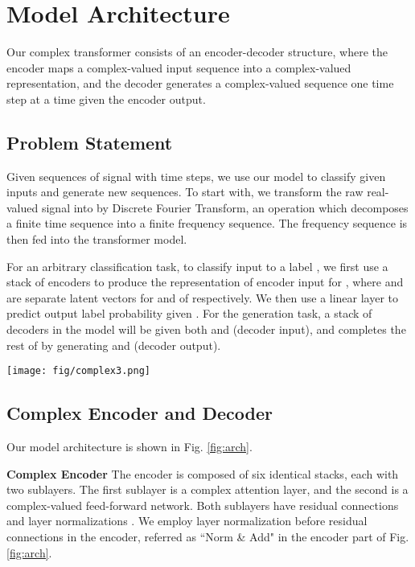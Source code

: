 \documentclass{article}
\begin{document}
\section{Model Architecture}
\label{sec:model}

Our complex transformer consists of an encoder-decoder structure, where the encoder maps a complex-valued input sequence into a complex-valued representation, and the decoder generates a complex-valued sequence one time step at a time given the encoder output.

\subsection{Problem Statement}
Given  sequences of signal  with  time steps, we use our model to classify given inputs and generate new sequences. To start with, we transform the raw real-valued signal  into  by Discrete Fourier Transform, an operation which decomposes a finite time sequence into a finite frequency sequence. The frequency sequence  is then fed into the transformer model. 

For an arbitrary classification task, to classify input  to a label , we first use a stack of encoders to produce the representation of encoder input  for , where  and  are separate latent vectors for  and  of  respectively. We then use a linear layer to predict output label probability given . For the generation task, a stack of decoders in the model will be given both  and   (decoder input), and completes the rest of  by generating  and  (decoder output). 
\begin{figure*}[]
\begin{center}
\texttt{[image: fig/complex3.png]}
\end{center}
\caption{Model Architecture Overview (Left: Encoder; Right: Decoder).}
\label{fig:arch}
\end{figure*}
\vspace{-3mm}

\subsection{Complex Encoder and Decoder}

Our model architecture is shown in Fig. \ref{fig:arch}. 

\textbf{Complex Encoder} The encoder is composed of six identical stacks, each with two sublayers. The first sublayer is a complex attention layer, and the second is a complex-valued feed-forward network. Both sublayers have residual connections \cite{he2016deep} and layer normalizations \cite{ba2016layer}. We employ layer normalization before residual connections in the encoder, referred as ``Norm \& Add" in the encoder part of Fig. \ref{fig:arch}.
\end{document}
